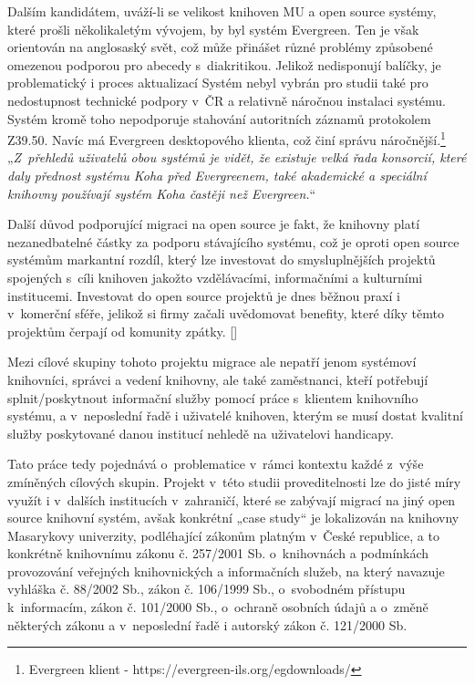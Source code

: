 \documentclass[
	11pt, oneside, printed, draft, 
	table,   %
	lof,     %
	lot     %
]{fithesis3}
\makeatletter
\newcommand{\citepages}[2]{[\cite[#1]{#2}]}
\newcommand{\citace}[1]{„\textit{#1}“} %
\newcommand{\mezera}{\bigskip}
\makeatother
\begin{document}
{Dalším kandidátem, uváží-li se velikost knihoven MU a open source systémy, které prošli několikaletým vývojem, by byl systém Evergreen. Ten je však orientován na anglosaský svět, což může přinášet různé problémy způsobené omezenou podporou pro abecedy s~diakritikou. Jelikož nedisponují balíčky, je problematický i proces aktualizací%
 Systém nebyl vybrán pro studii také pro nedostupnost technické podpory v~ČR a relativně náročnou instalaci %
  systému. Systém kromě toho nepodporuje stahování autoritních záznamů protokolem Z39.50.%
 Navíc má Evergreen desktopového klienta, což činí správu náročnější.\footnote{Evergreen klient - https://evergreen-ils.org/egdownloads/}
 \mezera
 \citace{Z~přehledů uživatelů obou systémů je vidět, že existuje velká řada konsorcií, které daly přednost systému Koha před Evergreenem, také akademické a speciální knihovny používají systém Koha častěji než Evergreen.}
 \mezera%

Další důvod podporující migraci na open source je fakt, že knihovny platí nezanedbatelné částky za podporu stávajícího systému, což je oproti open source systémům markantní rozdíl, který lze investovat do smysluplnějších projektů spojených s~cíli knihoven jakožto vzdělávacími, informačními a kulturními institucemi. Investovat do open source projektů je dnes běžnou praxí i v~komerční sféře, jelikož si firmy začali uvědomovat benefity, které díky těmto projektům čerpají od komunity zpátky. \citepages{129-132}{Fogel2012}

Mezi cílové skupiny tohoto projektu migrace ale nepatří jenom systémoví knihovníci, správci a vedení knihovny, ale také zaměstnanci, kteří potřebují splnit/poskytnout informační služby pomocí práce s~klientem knihovního systému, a v~neposlední řadě i uživatelé knihoven, kterým se musí dostat kvalitní služby poskytované danou institucí nehledě na uživatelovi handicapy.

Tato práce tedy pojednává o~problematice v~rámci kontextu každé z~výše zmíněných cílových skupin. Projekt v~této studii proveditelnosti lze do jisté míry využít i v~dalších institucích v~zahraničí, které se zabývají migrací na jiný open source knihovní systém, avšak konkrétní „case study“ je lokalizován na knihovny Masarykovy univerzity, podléhající zákonům platným v~České republice, a to konkrétně knihovnímu zákonu č. 257/2001 Sb. o~knihovnách a podmínkách provozování veřejných knihovnických a informačních služeb, na který navazuje vyhláška č. 88/2002 Sb., zákon č. 106/1999 Sb., o~svobodném přístupu k~informacím, zákon č. 101/2000 Sb., o~ochraně osobních údajů a o~změně některých zákonu a v~neposlední řadě i autorský zákon č. 121/2000 Sb.

}
\end{document}
